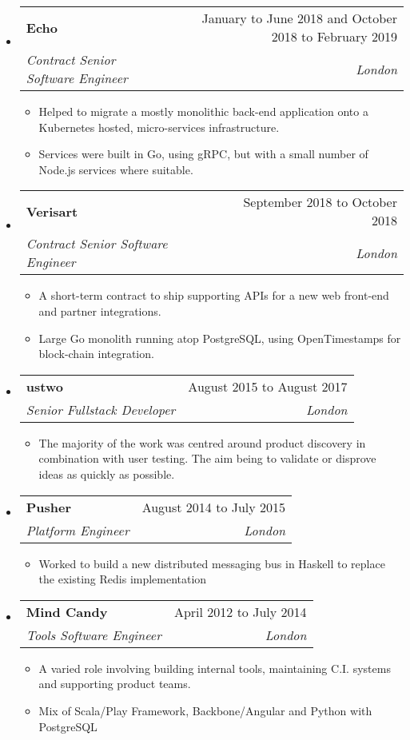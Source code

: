 \documentclass[letterpaper,12pt]{article}[leftmargin=*]
\makeatletter
\def \entryspacing {-0pt}
\newenvironment{resumeEntry}[0]{
  \begin{itemize}[leftmargin=2.5mm]
  }{
  \end{itemize}\vspace{\entryspacing}
}
\newenvironment{resumeItemList}[0]{
  \begin{itemize}[leftmargin=4.5mm]
  }{
  \end{itemize}
}
\newcommand{\resumeItem}[1]{
  \item\small{
    {#1 \vspace{-2pt}}
  }
}
\newcommand{\resumeEntryTSDL}[4]{
  \vspace{-1pt}\item[]
    \begin{tabularx}{0.97\textwidth}{X@{\hspace{60pt}}r}
      \textbf{\color{primary}#1} & {\firabook\color{accent}\small#2} \\
      \textit{\color{accent}\small#3} & \textit{\color{accent}\small#4} \\
    \end{tabularx}\vspace{-6pt}
}
\makeatother
\begin{document}
  \begin{resumeEntry}
    \resumeEntryTSDL{Echo}{January to June 2018 and October 2018 to February 2019}
      {Contract Senior Software Engineer}{London}
    \begin{resumeItemList}
      \resumeItem{Helped to migrate a mostly monolithic back-end application onto a Kubernetes hosted, micro-services infrastructure.}
      \resumeItem{Services were built in Go, using gRPC, but with a small number of Node.js services where suitable.}
    \end{resumeItemList}
  \end{resumeEntry}

  \begin{resumeEntry}
    \resumeEntryTSDL{Verisart}{September 2018 to October 2018}
      {Contract Senior Software Engineer}{London}
    \begin{resumeItemList}
      \resumeItem{A short-term contract to ship supporting APIs for a new web front-end and partner integrations.}
      \resumeItem{Large Go monolith running atop PostgreSQL, using OpenTimestamps for block-chain integration.}
    \end{resumeItemList}
  \end{resumeEntry}

  \begin{resumeEntry}
    \resumeEntryTSDL{ustwo}{August 2015 to August 2017}{Senior Fullstack Developer}{London}
    \begin{resumeItemList}
      \resumeItem{The majority of the work was centred around product discovery in combination with user testing. The aim being to validate or disprove ideas as quickly as possible.}
    \end{resumeItemList}
  \end{resumeEntry}

  \begin{resumeEntry}
    \resumeEntryTSDL{Pusher}{August 2014 to July 2015}
      {Platform Engineer}{London}
    \begin{resumeItemList}
      \resumeItem{Worked to build a new distributed messaging bus in Haskell to replace the existing Redis implementation}
    \end{resumeItemList}
  \end{resumeEntry}

  \begin{resumeEntry}
    \resumeEntryTSDL{Mind Candy}{April 2012 to July 2014}{Tools Software Engineer}{London}
    \begin{resumeItemList}
      \resumeItem{A varied role involving building internal tools, maintaining C.I. systems and supporting product teams.}
      \resumeItem{Mix of Scala/Play Framework, Backbone/Angular and Python with PostgreSQL}
    \end{resumeItemList}
  \end{resumeEntry}
\end{document}
